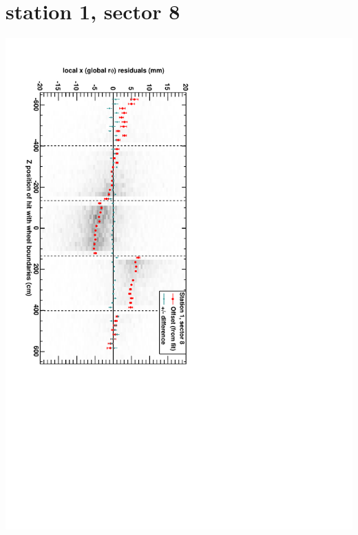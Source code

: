 \documentclass[compress]{beamer}
\begin{document}
\section*{station 1, sector 8}
\begin{frame} \vfill \mbox{\hspace{-1 cm}\includegraphics[height=1.2\linewidth, angle=90]{DTrphiVsZ_st1_sr08.pdf}} \end{frame}
\end{document}
